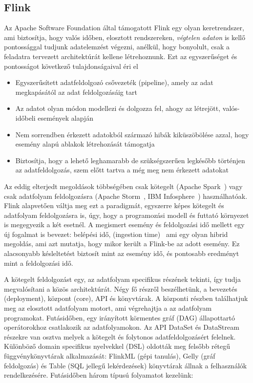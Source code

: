 \documentclass[a4paper,12pt]{article}
\begin{document}
\subsection{Flink}
Az Apache Software Foundation által támogatott Flink egy olyan keretrendszer, ami biztosítja, hogy valós időben, elosztott rendszereken, \textsl{végtelen adaton} is kellő pontossággal tudjunk adatelemzést végezni, anélkül, hogy bonyolult, csak a feladatra tervezett architektúrát kellene létrehoznunk. Ezt az egyszerűséget és pontosságot következő tulajdonságaival éri el~\cite{flinkartisans}
\begin{itemize}
\item Egyszerűsített adatfeldolgozó csővezeték (pipeline), amely az adat megkapásától az adat feldolgozásáig tart
\item Az adatot olyan módon modellezi és dolgozza fel, ahogy az létrejött, valós-időbeli események alapján
\item Nem sorrendben érkezett adatokból származó hibák kiküszöbölése azzal, hogy esemény alapú ablakok létrehozását támogatja
\item Biztosítja, hogy a lehető leghamarabb de szükségszerűen legkésőbb történjen az adatfeldolgozás, szem előtt tartva a még meg nem érkezett adatokat
\end{itemize}

Az eddig elterjedt megoldások többségében csak kötegelt (Apache Spark~\cite{spark}) vagy csak adatfolyam feldolgozásra (Apache Storm~\cite{storm}, IBM Infosphere~\cite{infosphere}) használhatóak. Flink alapvetően váltja meg ezt a paradigmát, egyszerre képes kötegelt és adatfolyam feldolgozásra is, úgy, hogy a programozási modell és futtató környezet is megegyezik a két esetnél. A megismert esemény és feldolgozási idő mellett egy új fogalmat is bevezet: belépési idő, (ingestion time)~\cite{ingestion} ami egy olyan hibrid megoldás, ami azt mutatja, hogy mikor került a Flink-be az adott esemény.
Ez alacsonyabb késleltetést biztosít mint az esemény idő, és pontosabb eredményt mint a feldolgozási idő. \newline

A kötegelt feldolgozást egy, az adatfolyam specifikus részének tekinti, így tudja megvalósítani a közös architektúrát. Négy fő részről beszélhetünk, a bevezetés (deployment), központ (core), API és könyvtárak. A központi részben találhatjuk meg az elosztott adatfolyam motort, ami végrehajtja a az adatfolyam programokat. Futásidőben, egy irányított körmentes gráf (DAG) állapottartó operátorokhoz csatlakozik az adatfolyamokon. Az API DataSet és DataStream részekre van osztva melyek a kötegelt és folytonos adatfeldolgozásért felelnek. Különböző domain specifikus nyelvekkel (DSL) oldották meg felsőbb rétegű függvénykönyvtárak alkalmazását: FlinkML (gépi tanulás), Gelly (gráf feldolgozás) és Table (SQL jellegű lekérdezések) könyvtárak állnak a felhasználók rendelkezésére.  Futásidőben három típusú folyamatot kezelünk:
 
\end{document}
